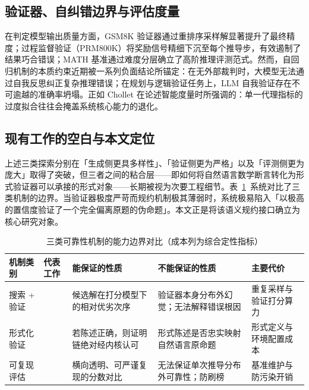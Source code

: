 ﻿\documentclass[UTF8,a4paper,11pt]{ctexart}
\theoremstyle{definition}
\begin{document}
\subsection{验证器、自纠错边界与评估度量}
在判定模型输出质量方面，GSM8K 验证器\cite{cobbe2021gsm8k}通过重排序采样解显著提升了最终精度；过程监督验证（PRM800K）\cite{lightman2023}将奖励信号精细下沉至每个推导步，有效遏制了结果巧合错误；MATH 基准\cite{hendrycks2021math}通过难度分层确立了高阶推理评测范式。然而，自回归机制的本质约束近期被一系列负面结论所锚定：在无外部裁判时，大模型无法通过自我反思纠正复杂推理错误\cite{huang2023selfcorrect}；在规划与逻辑验证任务上，LLM 自我验证存在不可逾越的准确率坍塌\cite{stechly2024selfverif}。正如 Chollet 在论述智能度量时所强调的：单一代理指标的过度拟合往往会掩盖系统核心能力的退化\cite{chollet2019}。

\subsection{现有工作的空白与本文定位}
上述三类探索分别在「生成侧更具多样性」、「验证侧更为严格」以及「评测侧更为庞大」取得了突破，但三者之间的粘合层——即如何将自然语言数学断言转化为形式验证器可以承接的形式对象——长期被视为次要工程细节。表~\ref{tab:mechanisms}~系统对比了三类机制的边界。当验证器极度严苛而规约机制极其薄弱时，系统极易陷入「以极高的置信度验证了一个完全偏离原题的伪命题」。本文正是将该语义规约接口确立为核心研究对象。

\begin{table}[htbp]
\centering
\small
\caption{三类可靠性机制的能力边界对比（成本列为综合定性指标）}
\label{tab:mechanisms}
\begin{tabular}{p{2.0cm}p{3.1cm}p{3.2cm}p{3.2cm}p{1.9cm}}
\toprule
机制类别 & 代表工作 & 能保证的性质 & 不能保证的性质 & 主要代价 \\
\midrule
搜索 + 验证 & \cite{cobbe2021gsm8k,lightman2023} & 候选解在打分模型下的相对优劣次序 & 验证器本身分布外幻觉；无法解释错误根因 & 重复采样与验证打分算力 \\
形式化验证 & \cite{demoura2008z3,demoura2021lean4,yang2023leandojo} & 若陈述正确，则证明链绝对经内核认可 & 形式陈述是否忠实映射自然语言原命题 & 形式定义与环境配置成本 \\
可复现评估 & \cite{zheng2021minif2f,hendrycks2021math,azerbayev2023proofnet} & 横向透明、可严谨复现的分数对比 & 无法保证单次推导分布外可靠性；防刷榜 & 基准维护与防污染开销 \\
\bottomrule
\end{tabular}
\end{table}
\end{document}
